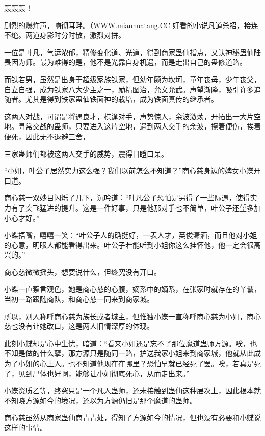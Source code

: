 
\begin{this_body}

轰轰轰！

剧烈的爆炸声，响彻耳畔。（WWW.mianhuatang.CC 好看的小说凡道杀招，接连不绝。两道身影时分时散，激烈对拼。

一位是叶凡，气运浓郁，精修变化道、光道，得到商家蛊仙指点，又认神秘蛊仙陆畏因为师。最为难得的是，他不是光靠自身机遇，而是走出自己的蛊修道路。

而铁若男，虽然是出身于超级家族铁家，但幼年颇为坎坷，童年丧母，少年丧父，自立自强，成为铁家八大少主之一，励精图治，允文允武。声望渐隆，吸引许多追随者。尤其是得到铁家蛊仙铁面神的栽培，成为铁面真传的继承者。

这两人对战，可谓是将遇良才，棋逢对手，声势惊人，余波激荡，开拓出一大片空地。寻常交战的蛊师，只要进入这片空地，遇到两人交手的余波，擦着便伤，挨着便死，因此无不退避三舍，

三家蛊师们都被这两人交手的威势，震得目瞪口呆。

“小姐，叶公子居然实力这么强？我们以前怎么不知道？”商心慈身边的婢女小蝶开口道。

商心慈一双妙目闪烁了几下，沉吟道：“叶凡公子恐怕是另得了一些际遇，使得实力有了突飞猛进的提升。这是一件好事，只是他那对手也不简单，叶公子还望多加小心才好。”

小蝶捂嘴，嘻嘻一笑：“叶公子人的确挺好，一表人才，英俊潇洒，而且他对小姐的心意，明眼人都能看得出来。叶公子若能听到小姐你这么挂怀他，他一定会很高兴的。”

商心慈微微摇头，想要说什么，但终究没有开口。

小蝶一直察言观色，她是商心慈的心腹，嫡系中的嫡系，在张家时就存在的丫鬟，当初一路跟随商队，和商心慈一同来到商家城。

所以，别人称呼商心慈为族长或者城主，但惟独小蝶一直称呼商心慈为小姐，商心慈也没有让她改口，这是两人旧情深厚的体现。

此刻小蝶却是心中生忧，暗道：“看来小姐还是忘不了那位魔道蛊师方源。唉，也不知是做的什么孽，那方源只是随同一路，护送我家小姐来到商家城，他就从此成为了小姐的心上人。也不知道他现在在哪里？恐怕早就已经死了罢。唉，若真是死了，见到尸体也好啊，能够让小姐彻底死心，从而走出来。”

小蝶资质乙等，终究只是一个凡人蛊师，还未接触到蛊仙这种层次上，因此根本就不知晓方源如今的境况，还以为方源仍旧是那个魔道的蛊师。

商心慈虽然从商家蛊仙商青青处，得知了方源如今的情况，但也没有必要和小蝶说这样的事情。


\end{this_body}
